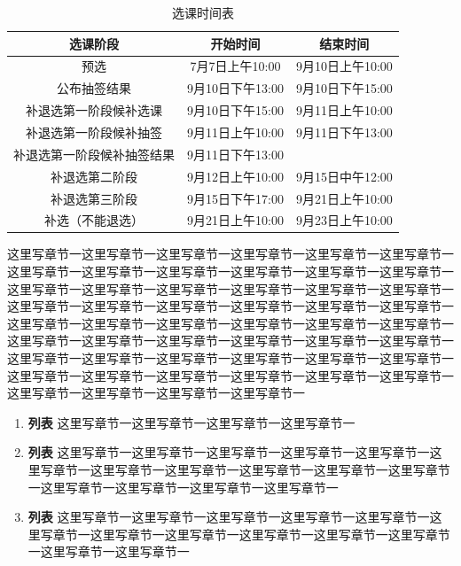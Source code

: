 \documentclass[UTF8,12pt,a4paper]{ctexart}
\begin{document}
\begin{table}[h]
		\renewcommand\arraystretch{1.2}
		\centering
	\begin{tabular}{@{}ccc@{}}
		\toprule
		\textbf{选课阶段}               & \textbf{开始时间}         & \textbf{结束时间}        \\ \midrule
		预选                 & 7月7日上午10:00  & 9月10日上午10:00 \\
		公布抽签结果             & 9月10日下午13:00 & 9月10日下午15:00 \\
		补退选第一阶段候补选课        & 9月10日下午15:00 & 9月11日上午10:00 \\
		补退选第一阶段候补抽签        & 9月11日上午10:00 & 9月11日下午13:00 \\
		补退选第一阶段候补抽签结果      & 9月11日下午13:00 &              \\
		补退选第二阶段      & 9月12日上午10:00 & 9月15日中午12:00 \\
		补退选第三阶段& 9月15日下午17:00 & 9月21日上午10:00 \\
		补选（不能退选）           & 9月21日上午10:00 & 9月23日上午10:00 \\ \bottomrule
	\end{tabular}
	\caption{选课时间表}
\end{table}

这里写章节一这里写章节一这里写章节一这里写章节一这里写章节一这里写章节一这里写章节一这里写章节一这里写章节一这里写章节一这里写章节一这里写章节一这里写章节一这里写章节一这里写章节一这里写章节一这里写章节一这里写章节一这里写章节一这里写章节一这里写章节一这里写章节一这里写章节一这里写章节一这里写章节一这里写章节一这里写章节一这里写章节一这里写章节一这里写章节一这里写章节一这里写章节一这里写章节一这里写章节一这里写章节一这里写章节一这里写章节一这里写章节一这里写章节一这里写章节一这里写章节一这里写章节一这里写章节一这里写章节一这里写章节一这里写章节一这里写章节一这里写章节一这里写章节一这里写章节一这里写章节一这里写章节一
\begin{enumerate}
	\setlength{\parindent}{2em}
	\renewcommand{\labelenumi}{\textbf{\theenumi .}}
	\item{\textbf{列表}}
	这里写章节一这里写章节一这里写章节一这里写章节一
	
	\item{\textbf{列表}}
	这里写章节一这里写章节一这里写章节一这里写章节一这里写章节一这里写章节一这里写章节一这里写章节一这里写章节一这里写章节一这里写章节一这里写章节一这里写章节一这里写章节一这里写章节一
	\item{\textbf{列表}}
	这里写章节一这里写章节一这里写章节一这里写章节一这里写章节一这里写章节一这里写章节一这里写章节一这里写章节一这里写章节一这里写章节一这里写章节一这里写章节一
\end{enumerate}
\end{document}
